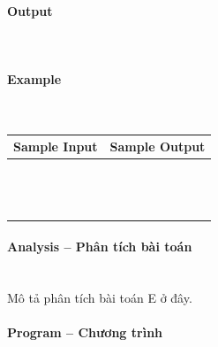 \documentclass{article}
\begin{document}
\paragraph{Output}\mbox{} \\


\paragraph{Example}\mbox{} \\

\begin{table}[h]
    \centering
    \begin{tabular}{|l|r|}
        \hline
        \textbf{Sample Input} & \textbf{Sample Output} \\
        \hline
		&  \\ 
		&  \\ 
		&  \\ 
		&  \\ 
		&  \\
		&  \\ 
		&  \\ 
		&  \\ 
		&  \\ 
		&  \\ 
		&  \\ 
		&  \\
		&  \\ \hline
    \end{tabular}
\end{table}

\paragraph{Analysis -- Phân tích bài toán} \mbox{} \\

Mô tả phân tích bài toán E ở đây.

\paragraph{Program -- Chương trình} \mbox{} \\

\begin{lstlisting} 

\end{lstlisting}


\end{document}
